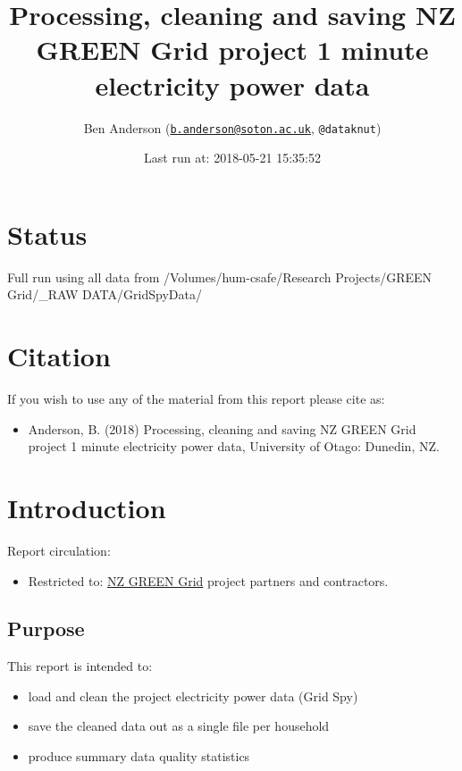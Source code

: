 \documentclass[]{article}
\title{Processing, cleaning and saving NZ GREEN Grid project 1 minute
electricity power data}
\author{Ben Anderson
(\href{mailto:b.anderson@soton.ac.uk}{\nolinkurl{b.anderson@soton.ac.uk}},
\texttt{@dataknut})}
\date{Last run at: 2018-05-21 15:35:52}
\providecommand{\tightlist}{%
  \setlength{\itemsep}{0pt}\setlength{\parskip}{0pt}}
\begin{document}
\maketitle

{
\setcounter{tocdepth}{2}
\tableofcontents
}
\newpage

\section{Status}\label{status}

Full run using all data from /Volumes/hum-csafe/Research Projects/GREEN
Grid/\_RAW DATA/GridSpyData/

\section{Citation}\label{citation}

If you wish to use any of the material from this report please cite as:

\begin{itemize}
\tightlist
\item
  Anderson, B. (2018) Processing, cleaning and saving NZ GREEN Grid
  project 1 minute electricity power data, University of Otago: Dunedin,
  NZ.
\end{itemize}

\newpage

\section{Introduction}\label{introduction}

Report circulation:

\begin{itemize}
\tightlist
\item
  Restricted to:
  \href{https://www.otago.ac.nz/centre-sustainability/research/energy/otago050285.html}{NZ
  GREEN Grid} project partners and contractors.
\end{itemize}

\subsection{Purpose}\label{purpose}

This report is intended to:

\begin{itemize}
\tightlist
\item
  load and clean the project electricity power data (Grid Spy)
\item
  save the cleaned data out as a single file per household
\item
  produce summary data quality statistics
\end{itemize}
\end{document}

